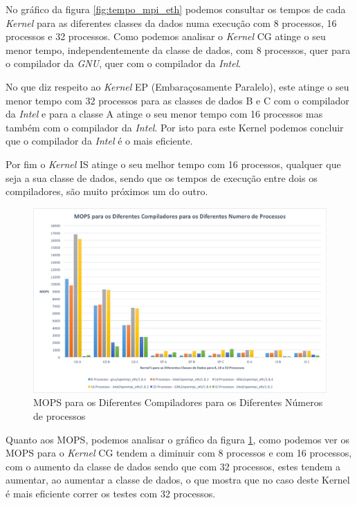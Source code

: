 \documentclass[conference,compsoc]{IEEEtran}
\begin{document}
No gráfico da figura \ref{fig:tempo_mpi_eth} podemos consultar os tempos de cada \textit{Kernel} para as diferentes classes da dados numa execução com 8 processos, 16 processos e 32 processos. Como podemos analisar o \textit{Kernel} CG atinge o seu menor tempo, independentemente da classe de dados, com 8 processos, quer para o compilador da \textit{GNU}, quer com o compilador da \textit{Intel}. 

No que diz respeito ao \textit{Kernel} EP (Embaraçosamente Paralelo), este atinge o seu menor tempo com 32 processos para as classes de dados B e C com o compilador da \textit{Intel} e para a classe A atinge o seu menor tempo com 16 processos mas também com o compilador da \textit{Intel}. Por isto para este Kernel podemos concluir que o compilador da \textit{Intel} é o mais eficiente.

Por fim o \textit{Kernel} IS atinge o seu melhor tempo com 16 processos, qualquer que seja a sua classe de dados, sendo que os tempos de execução entre dois os compiladores, são muito próximos um do outro.

\begin{figure}[h!]
\centering
\includegraphics[scale=0.325]{MPI/mops_dif_compiladores_dif_num_proc.png}
\caption{MOPS para os Diferentes Compiladores para os Diferentes Números de processos}
\label{fig:mops_mpi_eth}
\end{figure}

Quanto aos MOPS, podemos analisar o gráfico da figura \ref{fig:mops_mpi_eth}, como podemos ver os MOPS para o \textit{Kernel} CG tendem a diminuir com 8 processos e com 16 processos, com o aumento da classe de dados sendo que com 32 processos, estes tendem a aumentar, ao aumentar a classe de dados, o que mostra que no caso deste Kernel é mais eficiente correr os testes com 32 processos.
\end{document}
